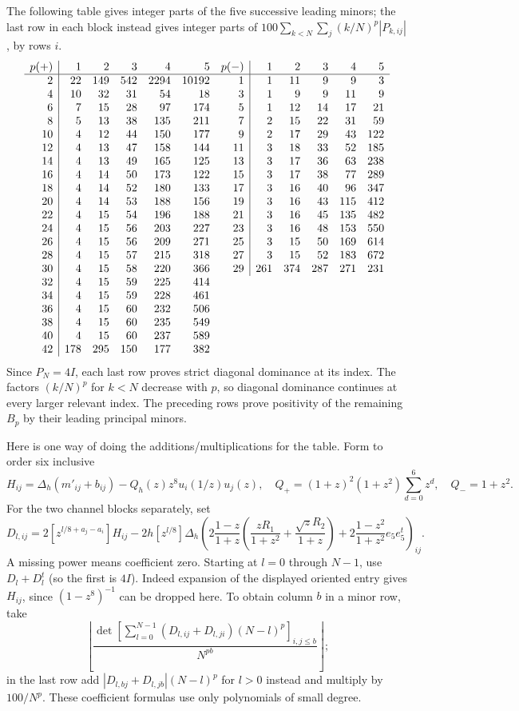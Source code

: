 The following table gives integer parts of the five successive leading minors; the last row in each block instead gives integer parts of \(100\sum_{k<N}\sum_j (k/N)^p |P_{k,ij}|\), by rows \(i\).
\[
\begin{array}{r|rrrrr@{\quad}r|rrrrr}
p(+)&1&2&3&4&5&p(-)&1&2&3&4&5\\\hline
2&22&149&542&2294&10192&1&1&11&9&9&3\\
4&10&32&31&54&18&3&1&9&9&11&9\\
6&7&15&28&97&174&5&1&12&14&17&21\\
8&5&13&38&135&211&7&2&15&22&31&59\\
10&4&12&44&150&177&9&2&17&29&43&122\\
12&4&13&47&158&144&11&3&18&33&52&185\\
14&4&13&49&165&125&13&3&17&36&63&238\\
16&4&14&50&173&122&15&3&17&38&77&289\\
18&4&14&52&180&133&17&3&16&40&96&347\\
20&4&14&53&188&156&19&3&16&43&115&412\\
22&4&15&54&196&188&21&3&16&45&135&482\\
24&4&15&56&203&227&23&3&16&48&153&550\\
26&4&15&56&209&271&25&3&15&50&169&614\\
28&4&15&57&215&318&27&3&15&52&183&672\\
30&4&15&58&220&366&29&261&374&287&271&231\\
32&4&15&59&225&414\\
34&4&15&59&228&461\\
36&4&15&60&232&506\\
38&4&15&60&235&549\\
40&4&15&60&237&589\\
42&178&295&150&177&382
\end{array}
\]
Since \(P_N=4I\), each last row proves strict diagonal dominance at its index. The factors \((k/N)^p\) for \(k<N\) decrease with \(p\), so diagonal dominance continues at every larger relevant index. The preceding rows prove positivity of the remaining \(B_p\) by their leading principal minors.

Here is one way of doing the additions/multiplications for the table. Form to order six inclusive
\[
 H_{ij}=\Delta_h(m'_{ij}+b_{ij})-Q_h(z) z^8 u_i(1/z)u_j(z),
 \quad Q_+=(1+z)^2(1+z^2)\sum_{d=0}^6 z^d,\quad Q_-=1+z^2 .
\]
For the two channel blocks separately, set
\[
 D_{l,ij}=2[z^{l/8+a_j-a_i}]H_{ij}
 -2h[z^{l/8}]\Delta_h\left(
 2\frac{1-z}{1+z}\left(\frac{z R_1}{1+z^2}+\frac{\sqrt z R_2}{1+z}\right)
 +2\frac{1-z^2}{1+z^2}e_5 e_5^t\right)_{ij}.
\]
A missing power means coefficient zero. Starting at \(l=0\) through \(N-1\), use \(D_l+D_l^t\) (so the first is \(4I\)). Indeed expansion of the displayed oriented entry gives \(H_{ij}\), since \((1-z^8)^{-1}\) can be dropped here. To obtain column \(b\) in a minor row, take
\[
 \left\lfloor
 \frac{\det[\sum_{l=0}^{N-1}(D_{l,ij}+D_{l,ji})(N-l)^p]_{i,j\le b}}{N^{pb}}
 \right\rfloor ;
\]
in the last row add \(|D_{l,bj}+D_{l,jb}|(N-l)^p\) for \(l>0\) instead and multiply by \(100/N^p\). These coefficient formulas use only polynomials of small degree.

